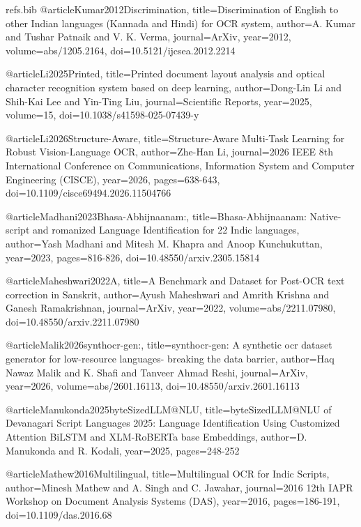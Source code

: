 \begin{filecontents}{refs.bib}
    @article{Kumar2012Discrimination,
    title={Discrimination of English to other Indian languages (Kannada and Hindi) for OCR system},
    author={A. Kumar and Tushar Patnaik and V. K. Verma},
    journal={ArXiv},
    year={2012},
    volume={abs/1205.2164},
    doi={10.5121/ijcsea.2012.2214}
    }
    
    @article{Li2025Printed,
    title={Printed document layout analysis and optical character recognition system based on deep learning},
    author={Dong-Lin Li and Shih-Kai Lee and Yin-Ting Liu},
    journal={Scientific Reports},
    year={2025},
    volume={15},
    doi={10.1038/s41598-025-07439-y}
    }
    
    @article{Li2026Structure-Aware,
    title={Structure-Aware Multi-Task Learning for Robust Vision-Language OCR},
    author={Zhe-Han Li},
    journal={2026 IEEE 8th International Conference on Communications, Information System and Computer Engineering (CISCE)},
    year={2026},
    pages={638-643},
    doi={10.1109/cisce69494.2026.11504766}
    }
    
    @article{Madhani2023Bhasa-Abhijnaanam:,
    title={Bhasa-Abhijnaanam: Native-script and romanized Language Identification for 22 Indic languages},
    author={Yash Madhani and Mitesh M. Khapra and Anoop Kunchukuttan},
    year={2023},
    pages={816-826},
    doi={10.48550/arxiv.2305.15814}
    }
    
    @article{Maheshwari2022A,
    title={A Benchmark and Dataset for Post-OCR text correction in Sanskrit},
    author={Ayush Maheshwari and Amrith Krishna and Ganesh Ramakrishnan},
    journal={ArXiv},
    year={2022},
    volume={abs/2211.07980},
    doi={10.48550/arxiv.2211.07980}
    }
    
    @article{Malik2026synthocr-gen:,
    title={synthocr-gen: A synthetic ocr dataset generator for low-resource languages- breaking the data barrier},
    author={Haq Nawaz Malik and K. Shafi and Tanveer Ahmad Reshi},
    journal={ArXiv},
    year={2026},
    volume={abs/2601.16113},
    doi={10.48550/arxiv.2601.16113}
    }
    
    @article{Manukonda2025byteSizedLLM@NLU,
    title={byteSizedLLM@NLU of Devanagari Script Languages 2025: Language Identification Using Customized Attention BiLSTM and XLM-RoBERTa base Embeddings},
    author={D. Manukonda and R. Kodali},
    year={2025},
    pages={248-252}
    }
    
    @article{Mathew2016Multilingual,
    title={Multilingual OCR for Indic Scripts},
    author={Minesh Mathew and A. Singh and C. Jawahar},
    journal={2016 12th IAPR Workshop on Document Analysis Systems (DAS)},
    year={2016},
    pages={186-191},
    doi={10.1109/das.2016.68}
    }
    

\end{filecontents}
